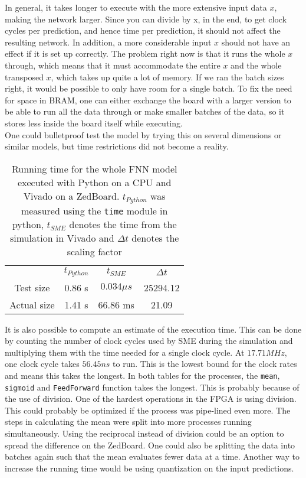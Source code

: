 In general, it takes longer to execute with the more extensive input data $x$, making the network larger. Since you can divide by x, in the end, to get clock cycles per prediction, and hence time per prediction, it should not affect the resulting network.
In addition, a more considerable input $x$ should not have an effect if it is set up correctly. The problem right now is that it runs the whole $x$ through, which means that it must accommodate the entire $x$ and the whole transposed $x$, which takes up quite a lot of memory. If we ran the batch sizes right, it would be possible to only have room for a single batch. To fix the need for space in \acrshort{BRAM}, one can either exchange the board with a larger version to be able to run all the data through or make smaller batches of the data, so it stores less inside the board itself while executing. \\
One could bulletproof test the model by trying this on several dimensions or similar models, but time restrictions did not become a reality.

\begin{table}
\centering
\begin{tabular}{c c c c } 
 \hline
& $t_{Python}$ & $t_{SME}$ & $\Delta t$\\
Test size & 0.86 s & $0.034 \mu s$ & 25294.12 \\ 
Actual size & 1.41 s & 66.86 ms & 21.09 \\ [1ex] 
 \hline
\end{tabular}
\caption{Running time for the whole FNN model executed with Python on a CPU and Vivado on a ZedBoard. $t_{Python}$ was measured using the \texttt{time} module in python, $t_{SME}$ denotes the time from the simulation in Vivado and $\Delta t$ denotes the scaling factor}
\label{table:compare}
\end{table}

It is also possible to compute an estimate of the execution time. This can be done by counting the number of clock cycles used by SME during the simulation and multiplying them with the time needed for a single clock cycle. At $17.71 MHz$, one clock cycle takes $56.45 ns $ to run.
This is the lowest bound for the clock rates and means this takes the longest. In both tables for the processes, the \texttt{mean}, \texttt{sigmoid} and \texttt{FeedForward} function takes the longest. This is probably because of the use of division. One of the hardest operations in the FPGA is using division. This could probably be optimized if the process was pipe-lined even more. The steps in calculating the mean were split into more processes running simultaneously. Using the reciprocal instead of division could be an option to spread the difference on the ZedBoard. One could also be splitting the data into batches again such that the mean evaluates fewer data at a time. Another way to increase the running time would be using quantization on the input predictions.\\

